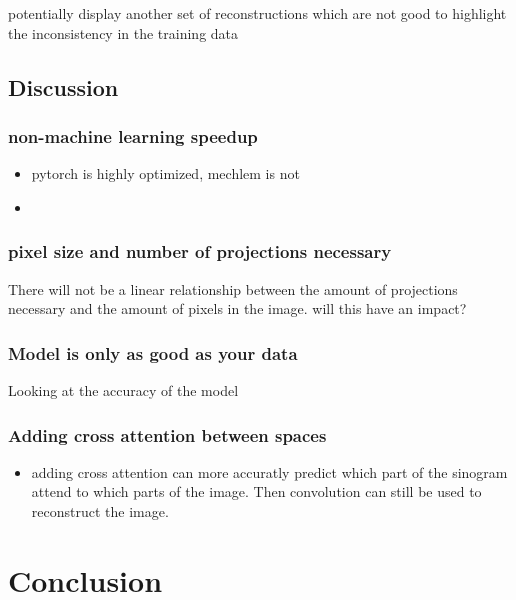 \documentclass[9pt,Preprint]{lapreprint}
\begin{document}
potentially display another set of reconstructions which are not good to highlight the inconsistency in the training data

\subsection{Discussion}

\subsubsection{non-machine learning speedup}

\begin{itemize}
\item pytorch is highly optimized, mechlem is not
\item
\end{itemize}

\subsubsection{pixel size and number of projections necessary}

There will not be a linear relationship between the amount of projections necessary and the amount of pixels in the image. will this have an impact?

\subsubsection{Model is only as good as your data}

Looking at the accuracy of the model

\subsubsection{Adding cross attention between spaces}

\begin{itemize}
\item adding cross attention can more accuratly predict which part of the sinogram attend to which parts of the image. Then convolution can still be used to reconstruct the image.
\end{itemize}

\section{Conclusion}

\printbibliography

\if@endfloat\clearpage\processdelayedfloats\clearpage\fi



\end{document}
